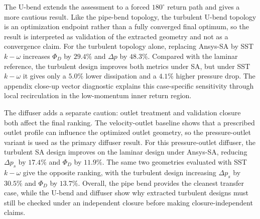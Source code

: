 The U-bend extends the assessment to a forced $180^\circ$ return path and gives a more cautious result. Like the pipe-bend topology, the turbulent U-bend topology is an optimization endpoint rather than a fully converged final optimum, so the result is interpreted as validation of the extracted geometry and not as a convergence claim. For the turbulent topology alone, replacing Ansys-SA by SST $k-\omega$ increases $\Phi_D$ by $29.4\%$ and $\Delta p$ by $48.3\%$. Compared with the laminar reference, the turbulent design improves both metrics under SA, but under SST $k-\omega$ it gives only a $5.0\%$ lower dissipation and a $4.1\%$ higher pressure drop. The appendix close-up vector diagnostic explains this case-specific sensitivity through local recirculation in the low-momentum inner return region.

The diffuser adds a separate caution: outlet treatment and validation closure both affect the final ranking. The velocity-outlet baseline shows that a prescribed outlet profile can influence the optimized outlet geometry, so the pressure-outlet variant is used as the primary diffuser result. For this pressure-outlet diffuser, the turbulent SA design improves on the laminar design under Ansys-SA, reducing $\Delta p_s$ by $17.4\%$ and $\Phi_D$ by $11.9\%$. The same two geometries evaluated with SST $k-\omega$ give the opposite ranking, with the turbulent design increasing $\Delta p_s$ by $30.5\%$ and $\Phi_D$ by $13.7\%$. Overall, the pipe bend provides the cleanest transfer case, while the U-bend and diffuser show why extracted turbulent designs must still be checked under an independent closure before making closure-independent claims.
